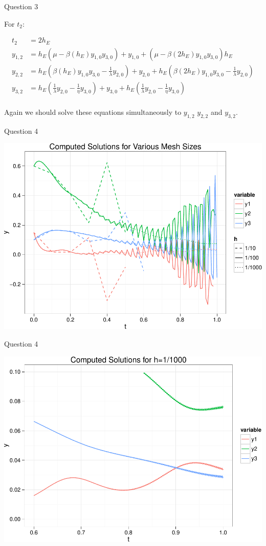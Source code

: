 \documentclass{beamer}
\begin{document}
\begin{frame}{Question 3}

For $t_2$:

\begin{align*}
t_2 &= 2h_E\\
y_{1,2} &= h_E(\mu - \beta (h_E)y_{1,0}y_{3,0}) + y_{1,0} + (\mu - \beta(2h_E)y_{1,0}y_{3,0})h_E\\
y_{2,2} &= h_E\left(\beta (h_E)y_{1,0}y_{3,0} - \frac{1}{\lambda}y_{2,0}\right) + y_{2,0} + h_E\left(\beta (2h_E)y_{1,0}y_{3,0} - \frac{1}{\lambda}y_{2,0}\right)\\
y_{3,2} &= h_E\left(\frac{1}{\lambda}y_{2,0} - \frac{1}{\eta}y_{3,0} \right ) + y_{3,0} + h_E\left(\frac{1}{\lambda}y_{2,0} - \frac{1}{\eta}y_{3,0} \right )\\
\end{align*}

Again we should solve these equations simultaneously to $y_{1,2}$ $y_{2,2}$ and $y_{3,2}$.


\end{frame}

\begin{frame}{Question 4}
	\begin{center}
		\includegraphics[width=\textwidth]{plot-crop.pdf}
	\end{center}
\end{frame}

\begin{frame}{Question 4}
	\begin{center}
		\includegraphics[width=\textwidth]{plot-small-crop.pdf}
	\end{center}
\end{frame}
\end{document}
